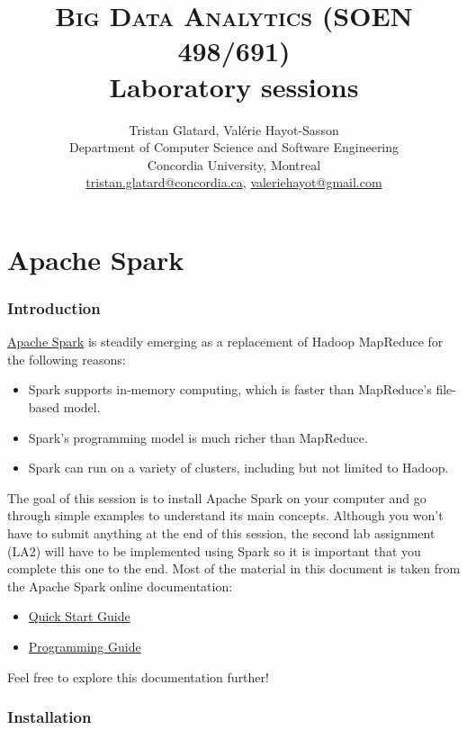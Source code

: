 \documentclass[11pt]{article}
\title{\textsc{Big Data Analytics (SOEN 498/691)} \\ Laboratory sessions}
\author{Tristan Glatard, Val\'erie Hayot-Sasson\\Department of Computer Science and Software Engineering\\Concordia University, Montreal\\\href{mailto:tristan.glatard@concordia.ca}{tristan.glatard@concordia.ca}, \href{mailto:valeriehayot@gmail.com}{valeriehayot@gmail.com}}
\begin{document}
\maketitle

\newpage

\tableofcontents

\newpage

\part{Apache Spark}

\section{Introduction}

\href{http://spark.apache.org}{Apache Spark} is steadily emerging as a
replacement of Hadoop MapReduce for the following reasons:
\begin{itemize}
\item Spark supports in-memory computing, which is faster
  than MapReduce's file-based model.
\item Spark's programming model is much richer than
  MapReduce.
  \item Spark can run on a variety of clusters, including but not
    limited to Hadoop.
\end{itemize}

The goal of this session is to install Apache Spark on your computer
and go through simple examples to understand its main
concepts. Although you won't have to submit anything at the end of
this session, the second lab assignment (LA2) will have to be
implemented using Spark so it is important that you complete this one
to the end.  Most of the material in this document is taken from the
Apache Spark online documentation:
\begin{itemize}
\item  \href{http://spark.apache.org/docs/latest/quick-start.html}{Quick Start Guide}
\item \href{http://spark.apache.org/docs/latest/programming-guide.html}{Programming Guide}
\end{itemize}
Feel free to explore this documentation further!

\section{Installation}
\end{document}
